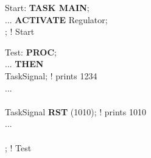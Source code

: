 Start: {\bf TASK MAIN};\\
 ... {\bf ACTIVATE} Regulator;\\  
; ! Start

Test: {\bf PROC};\\
 ... {\bf THEN} \\
\x {} TaskSignal; ! prints 1234\\
\x \x...\\
 \\
\x{} TaskSignal {\bf RST} (1010); ! prints 1010\\
\x \x...\\
 \\
; ! Test


